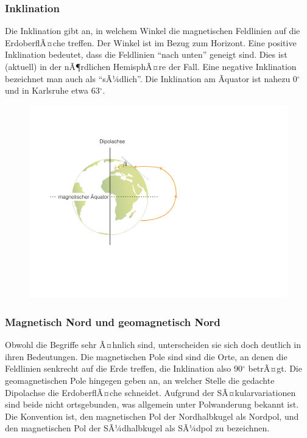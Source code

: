 \subsubsection{Inklination}
Die Inklination gibt an, in welchem Winkel die magnetischen Feldlinien auf die ErdoberflÃ¤che treffen. Der Winkel ist im Bezug zum Horizont. Eine positive Inklination bedeutet, dass die Feldlinien "`nach unten"' geneigt sind. Dies ist (aktuell) in der nÃ¶rdlichen HemisphÃ¤re der Fall. Eine negative Inklination bezeichnet man auch als "`sÃ¼dlich"'. Die Inklination am Ãquator ist nahezu 0$^{\circ}$ und in Karlsruhe etwa 63$^{\circ}$.

\begin{figure}[H]
	\centering
	\includegraphics[scale = 0.4]{MagnetikBilder/Inklination}
\end{figure}


\subsubsection{Magnetisch Nord und geomagnetisch Nord}
Obwohl die Begriffe sehr Ã¤hnlich sind, unterscheiden sie sich doch deutlich in ihren Bedeutungen. Die magnetischen Pole sind sind die Orte, an denen die Feldlinien senkrecht auf die Erde treffen, die Inklination also 90$^\circ$ betrÃ¤gt. Die geomagnetischen Pole hingegen geben an, an welcher Stelle die gedachte Dipolachse die ErdoberflÃ¤che schneidet. Aufgrund der SÃ¤kularvariationen sind beide nicht ortsgebunden, was allgemein unter Polwanderung bekannt ist. Die Konvention ist, den magnetischen Pol der Nordhalbkugel als Nordpol, und den magnetischen Pol der SÃ¼dhalbkugel als SÃ¼dpol zu bezeichnen. 


